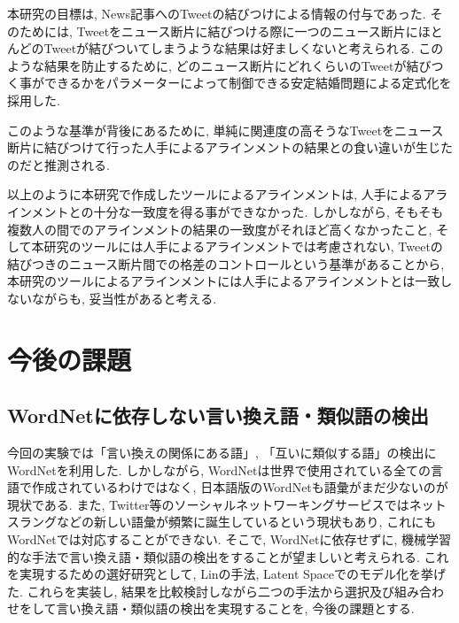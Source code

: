 \documentclass[12pt]{jarticle}
\begin{document}
本研究の目標は, News記事へのTweetの結びつけによる情報の付与であった. 
そのためには, Tweetをニュース断片に結びつける際に一つのニュース断片にほとんどのTweetが結びついてしまうような結果は好ましくないと考えられる. 
このような結果を防止するために, どのニュース断片にどれくらいのTweetが結びつく事ができるかをパラメーターによって制御できる安定結婚問題による定式化を採用した. 

このような基準が背後にあるために, 単純に関連度の高そうなTweetをニュース断片に結びつけて行った人手によるアラインメントの結果との食い違いが生じたのだと推測される. 


以上のように本研究で作成したツールによるアラインメントは, 人手によるアラインメントとの十分な一致度を得る事ができなかった. 
しかしながら, そもそも複数人の間でのアラインメントの結果の一致度がそれほど高くなかったこと, そして本研究のツールには人手によるアラインメントでは考慮されない, Tweetの結びつきのニュース断片間での格差のコントロールという基準があることから, 本研究のツールによるアラインメントには人手によるアラインメントとは一致しないながらも, 妥当性があると考える. 

\section{今後の課題}
\subsection{WordNetに依存しない言い換え語・類似語の検出}
今回の実験では「言い換えの関係にある語」, 「互いに類似する語」の検出にWordNetを利用した. しかしながら, WordNetは世界で使用されている全ての言語で作成されているわけではなく, 日本語版のWordNetも語彙がまだ少ないのが現状である. また, Twitter等のソーシャルネットワーキングサービスではネットスラングなどの新しい語彙が頻繁に誕生しているという現状もあり, これにもWordNetでは対応することができない. そこで, WordNetに依存せずに, 機械学習的な手法で言い換え語・類似語の検出をすることが望ましいと考えられる. これを実現するための選好研究として, Linの手法\cite{DekangLin}, Latent Spaceでのモデル化\cite{LatentSpace}を挙げた. これらを実装し, 結果を比較検討しながら二つの手法から選択及び組み合わせをして言い換え語・類似語の検出を実現することを, 今後の課題とする. 
\end{document}
